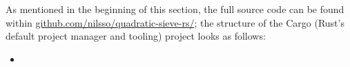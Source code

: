 \documentclass{report}
\begin{document}
As mentioned in the beginning of this section, the full source code can be found
within
\href{https://github.com/nilsso/quadratic-sieve-rs/tree/main/src}{github.com/nilsso/quadratic-sieve-rs/};
the structure of the Cargo (Rust's default project manager and tooling) project
looks as follows:
\begin{itemize}
    \item 
\end{itemize}
\end{document}

